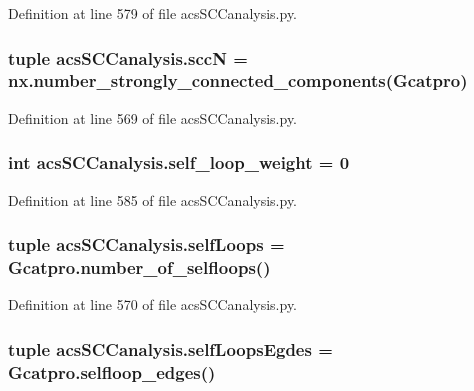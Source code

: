 Definition at line 579 of file acs\+S\+C\+Canalysis.\+py.

\hypertarget{a00130_a185cbf8ef1ec67f52695562582418793}{
\subsubsection[{scc\+N}]{\setlength{\rightskip}{0pt plus 5cm}tuple acs\+S\+C\+Canalysis.\+scc\+N = nx.\+number\+\_\+strongly\+\_\+connected\+\_\+components({\bf Gcatpro})}}\label{a00130_a185cbf8ef1ec67f52695562582418793}


Definition at line 569 of file acs\+S\+C\+Canalysis.\+py.

\hypertarget{a00130_ae9790fbc87f233c94224436a9cbd59c1}{
\subsubsection[{self\+\_\+loop\+\_\+weight}]{\setlength{\rightskip}{0pt plus 5cm}int acs\+S\+C\+Canalysis.\+self\+\_\+loop\+\_\+weight = 0}}\label{a00130_ae9790fbc87f233c94224436a9cbd59c1}


Definition at line 585 of file acs\+S\+C\+Canalysis.\+py.

\hypertarget{a00130_a8fec45ae9b70981ce94eaeed14d888b1}{
\subsubsection[{self\+Loops}]{\setlength{\rightskip}{0pt plus 5cm}tuple acs\+S\+C\+Canalysis.\+self\+Loops = Gcatpro.\+number\+\_\+of\+\_\+selfloops()}}\label{a00130_a8fec45ae9b70981ce94eaeed14d888b1}


Definition at line 570 of file acs\+S\+C\+Canalysis.\+py.

\hypertarget{a00130_ad34596e89eef2cfb696f61a810765c7a}{
\subsubsection[{self\+Loops\+Egdes}]{\setlength{\rightskip}{0pt plus 5cm}tuple acs\+S\+C\+Canalysis.\+self\+Loops\+Egdes = Gcatpro.\+selfloop\+\_\+edges()}}\label{a00130_ad34596e89eef2cfb696f61a810765c7a}


